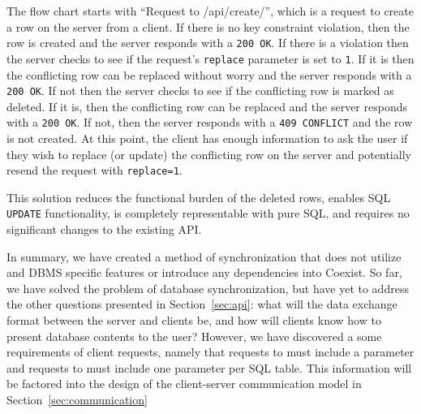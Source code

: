 The flow chart starts with ``Request to /api/create/'', which is a request
to create a row on the server from a client. If there is no key constraint
violation, then the row is created and the server responds with a \texttt{200
OK}. If there is a violation then the server checks to see if the request's
\texttt{replace} parameter is set to \texttt{1}. If it is then the conflicting
row can be replaced without worry and the server responds with a \texttt{200
OK}.  If not then the server checks to see if the conflicting row is marked as
deleted. If it is, then the conflicting row can be replaced and the server
responds with a \texttt{200 OK}. If not, then the server responds with a
\texttt{409 CONFLICT} and the row is not created. At this point, the client has
enough information to ask the user if they wish to replace (or update) the
conflicting row on the server and potentially resend the request with
\texttt{replace=1}. 
 
This solution reduces the functional burden of the deleted rows, enables SQL
\texttt{UPDATE} functionality, is completely representable with pure SQL, and
requires no significant changes to the existing API. 

In summary, we have created a method of synchronization that does not utilize
and DBMS specific features or introduce any dependencies into Coexist. So far,
we have solved the problem of database synchronization, but have yet to address
the other questions presented in Section~\ref{sec:api}: what will the data
exchange format between the server and clients be, and how will clients know how
to present database contents to the user? However, we have discovered a some
requirements of client requests, namely that requests to \create must include a
 parameter and requests to \sync must include one 
parameter per SQL table. This information will be factored into the design of
the client-server communication model in Section~\ref{sec:communication}

